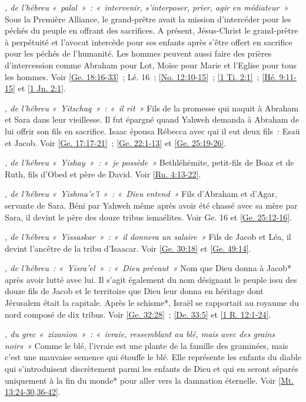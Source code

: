 \begin{multicols}{2}
\textit{, de l'hébreu «~palal~»~: «~intervenir, s'interposer, prier, agir en médiateur~»}\newline
Sous la Première Alliance, le grand-prêtre avait la mission d'intercéder pour les péchés du peuple en offrant des sacrifices. A présent, Jésus-Christ le grand-prêtre à perpétuité et l'avocat intercède pour ses enfants après s'être offert en sacrifice pour les péchés de l'humanité. Les hommes peuvent aussi faire des prières d'intercession comme Abraham pour Lot, Moïse pour Marie et l'Eglise pour tous les hommes. Voir \vref{Ge. 18:16-33}~; Lé. 16~; \vref{No. 12:10-15}~; \vref{1 Ti. 2:1}~; \vref{Hé. 9:11-15} et \vref{1 Jn. 2:1}.

\textit{, de l'hébreu «~Yitschaq~»~: «~il rit~»}\newline
Fils de la promesse qui naquit à Abraham et Sara dans leur vieillesse. Il fut épargné quand Yahweh demanda à Abraham de lui offrir son fils en sacrifice. Isaac épousa Rébecca avec qui il eut deux fils~: Esaü et Jacob. Voir \vref{Ge. 17:17-21}~; \vref{Ge. 22:1-13} et \vref{Ge. 25:19-26}.

\textit{, de l'hébreu «~Yishay~»~: «~je possède~»}\newline
Bethléhémite, petit-fils de Boaz et de Ruth, fils d'Obed et père de David. Voir \vref{Ru. 4:13-22}.

\textit{, de l'hébreu «~Yishma'e'l~»~: «~Dieu entend~»}\newline
Fils d'Abraham et d'Agar, servante de Sara. Béni par Yahweh même après avoir été chassé avec sa mère par Sara, il devint le père des douze tribus ismaélites. Voir Ge. 16 et \vref{Ge. 25:12-16}.

\textit{, de l'hébreu «~Yissaskar~»~: «~il donnera un salaire~»}\newline
Fils de Jacob et Léa, il devint l'ancêtre de la tribu d'Isaacar. Voir \vref{Ge. 30:18} et \vref{Ge. 49:14}.

\textit{, de l'hébreu~: «~Yisra'el~»~: «~Dieu prévaut~»}\newline
Nom que Dieu donna à Jacob* après avoir lutté avec lui. Il s'agit également du nom désignant le peuple issu des douze fils de Jacob et le territoire que Dieu leur donna en héritage dont Jérusalem était la capitale. Après le schisme*, Israël se rapportait au royaume du nord composé de dix tribus. Voir \vref{Ge. 32:28}~; \vref{De. 33:5} et \vref{1 R. 12:1-24}.

\textit{, du grec «~zizanion~»~: «~ivraie, ressemblant au blé, mais avec des grains noirs~»}\newline
Comme le blé, l'ivraie est une plante de la famille des graminées, mais c'est une mauvaise semence qui étouffe le blé. Elle représente les enfants du diable qui s'introduisent discrètement parmi les enfants de Dieu et qui en seront séparés uniquement à la fin du monde* pour aller vers la damnation éternelle. Voir \vref{Mt. 13:24-30,36-42}.


\end{multicols}
